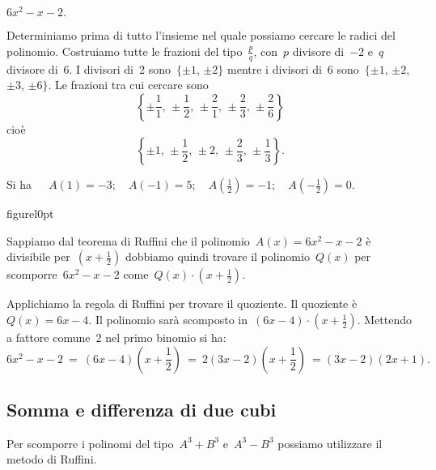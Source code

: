 \begin{exrig}
\begin{esempio}
$6x^{2}-x-2.$
\end{esempio}

Determiniamo prima di tutto l'insieme nel quale
possiamo cercare le radici del polinomio. Costruiamo tutte le frazioni
del tipo~$\frac{p}{q}$, con~$p$ divisore di~$-2$ e~$q$ divisore di~$6$. I
divisori di~2 sono~$\{\pm 1$, $\pm 2\}$ mentre i divisori di~6 sono~$\{\pm 1$, $\pm 2$, $\pm 3$, $\pm 6\}$.
Le frazioni tra cui cercare sono
\[\left\{\pm {\frac{1}{1}}\text{, }\pm \frac{1}{2}\text{, }\pm \frac{2}{1}\text{, }\pm
\frac{2}{3}\text{, }\pm \frac{2}{6}\right\}\]
cioè \[\left\{\pm 1\text{, }\pm\frac{1}{2}\text{, }\pm 2\text{, }\pm \frac{2}{3}\text{, }\pm \frac{1}{3}\right\}.\]

Si ha~$\quad A(1)=-3;\quad A(-1)=5;\quad A\left(\frac{1}{2}\right)=-1;\quad A\left(-{\frac{1}{2}}\right)=0$.

\begin{wrapfloat}{figure}{l}{0pt}
 
\end{wrapfloat}
Sappiamo dal teorema di Ruffini che il polinomio~$A(x)=6x^{2}-x-2$ è
divisibile per~$\left(x+\frac{1}{2}\right)$ dobbiamo quindi trovare il
polinomio~$Q(x)$ per scomporre~$6x^{2}-x-2$ come~$Q(x)\cdot \left(x+\frac{1}{2}\right)$.

Applichiamo la regola di Ruffini per trovare il quoziente. Il quoziente è~$Q(x)=6x-4$.
Il polinomio sarà scomposto in~$(6x-4)\cdot\left(x+\frac{1}{2}\right)$.
Mettendo a fattore comune~2 nel primo binomio si ha:
\[6x^{2}-x-2\ =\ (6x-4)%
\left(x+\frac{1}{2}\right)\ =\ 2(3x-2)\left(x+\frac{1}{2}\right)\ =(3x-2)(2x+1).\]


\end{exrig}

\ovalbox{\risolvii \ref{ese:13.80}, \ref{ese:13.81}, \ref{ese:13.82}, \ref{ese:13.83}, \ref{ese:13.84}}

\subsection{Somma e differenza di due cubi}

Per scomporre i polinomi del tipo~$A^{3}+B^{3}$ e~$A^{3}-B^{3}$
possiamo utilizzare il metodo di Ruffini.

